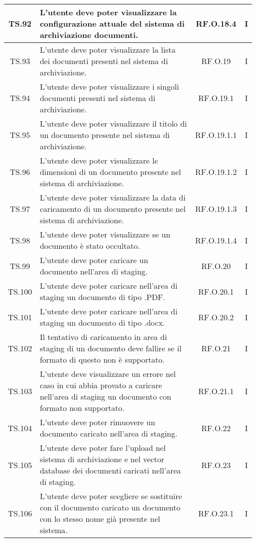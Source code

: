 {{{{{{{{{{\begin{xltabular}{\textwidth}{|c|X|c|c|}
    \hline
    TS.92 & L’utente deve poter visualizzare la configurazione attuale del sistema di archiviazione documenti. & RF.O.18.4 & I \\
    \hline
    TS.93 & L’utente deve poter visualizzare la lista dei documenti presenti nel sistema di archiviazione. & RF.O.19 & I \\
    \hline
    TS.94 & L’utente deve poter visualizzare i singoli documenti presenti nel sistema di archiviazione. & RF.O.19.1 & I \\
    \hline
    TS.95 & L’utente deve poter visualizzare il titolo di un documento presente nel sistema di archiviazione. & RF.O.19.1.1 & I \\
    \hline
    TS.96 & L’utente deve poter visualizzare le dimensioni di un documento presente nel sistema di archiviazione. & RF.O.19.1.2 & I \\
    \hline
    TS.97 & L’utente deve poter visualizzare la data di caricamento di un documento presente nel sistema di archiviazione. & RF.O.19.1.3 & I \\
    \hline
    TS.98 & L’utente deve poter visualizzare se un documento è stato occultato. & RF.O.19.1.4 & I \\
    \hline
    TS.99 & L’utente deve poter caricare un documento nell’area di staging. & RF.O.20 & I \\
    \hline
    TS.100 & L’utente deve poter caricare nell’area di staging un documento di tipo .PDF. & RF.O.20.1 & I \\
    \hline
    TS.101 & L’utente deve poter caricare nell’area di staging un documento di tipo .docx. & RF.O.20.2 & I \\
    \hline
    TS.102 & Il tentativo di caricamento in area di staging di un documento deve fallire se il formato di questo non è supportato. & RF.O.21 & I \\
    \hline
    TS.103 & L’utente deve visualizzare un errore nel caso in cui abbia provato a caricare nell’area di staging un documento con formato non supportato. & RF.O.21.1 & I \\
    \hline
    TS.104 & L’utente deve poter rimuovere un documento caricato nell’area di staging. & RF.O.22 & I \\
    \hline
    TS.105 & L’utente deve poter fare l’upload nel sistema di archiviazione e nel vector database dei documenti caricati nell’area di staging. & RF.O.23 & I \\
    \hline
    TS.106 & L’utente deve poter scegliere se sostituire con il documento caricato un documento con lo stesso nome già presente nel sistema. & RF.O.23.1 & I \\

\end{xltabular}}}}}}}}}}}
